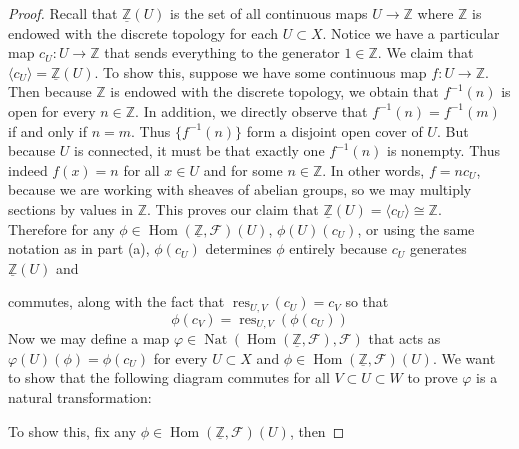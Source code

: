 \documentclass{article}
\newcommand{\Z}{\mathbb{Z}}
\newcommand{\fF}{\mathscr{F}}
\DeclareMathOperator{\res}{res}
\DeclareMathOperator{\Hom}{Hom}
\DeclareMathOperator{\Nat}{Nat}
\begin{document}
\begin{proof}
    Recall that $\underline{\Z}(U)$ is the set of all continuous maps $U\to \Z$ where $\Z$ is endowed with the discrete topology for each $U\subset X$. Notice we have a particular map $c_U:U\to \Z$ that sends everything to the generator $1\in \Z$. We claim that $\langle c_U \rangle = \underline{\Z}(U)$. To show this, suppose we have some continuous map $f:U\to \Z$. Then because $\Z$ is endowed with the discrete topology, we obtain that $f^{-1}(n)$ is open for every $n\in \Z$. In addition, we directly observe that $f^{-1}(n)=f^{-1}(m)$ if and only if $n=m$. Thus $\{f^{-1}(n)\}$ form a disjoint open cover of $U$. But because $U$ is connected, it must be that exactly one $f^{-1}(n)$ is nonempty. Thus indeed $f(x)=n$ for all $x\in U$ and for some $n\in \Z$. In other words, $f=nc_U$, because we are working with sheaves of abelian groups, so we may multiply sections by values in $\Z$. This proves our claim that $\underline{\Z}(U)=\langle c_U\rangle \cong \Z$.\\
    Therefore for any $\phi \in \Hom(\underline{\Z}, \fF)(U)$, $\phi(U)(c_U)$, or using the same notation as in part (a), $\phi(c_U)$ determines $\phi$ entirely because $c_U$ generates $\underline{\Z}(U)$ and
    \begin{center}
    \end{center}
    commutes, along with the fact that $\res_{U,V}(c_U)=c_V$ so that
    \[
    \phi(c_V)=\res_{U,V}(\phi(c_U))
    \]
    Now we may define a map $\varphi \in \Nat(\Hom(\underline{\Z},\fF),\fF)$ that acts as $\varphi(U)(\phi)=\phi(c_U)$ for every $U\subset X$ and $\phi\in \Hom(\underline{\Z},\fF)(U)$. We want to show that the following diagram commutes for all $V\subset U\subset W$ to prove $\varphi$ is a natural transformation:
    \begin{center}
    \end{center}
    To show this, fix any $\phi\in \Hom(\underline{\Z},\fF)(U)$, then 

\end{proof}
\end{document}
